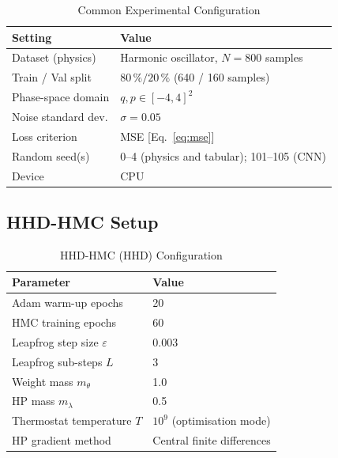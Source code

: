 \documentclass[11pt]{article}
\theoremstyle{definition}
\begin{document}
\begin{table}[H]
\centering
\caption{Common Experimental Configuration}
\label{tab:common_setup}
\renewcommand{\arraystretch}{1.2}
\begin{tabular}{ll}
\toprule
Setting & Value \\
\midrule
Dataset (physics)    & Harmonic oscillator, $N = 800$ samples \\
Train / Val split    & $80\,\% / 20\,\%$ (640 / 160 samples) \\
Phase-space domain   & $q, p \in [-4, 4]^2$ \\
Noise standard dev.  & $\sigma = 0.05$ \\
Loss criterion       & MSE [Eq.~\eqref{eq:mse}] \\
Random seed(s)       & 0--4 (physics and tabular); 101--105 (CNN) \\
Device               & CPU \\
\bottomrule
\end{tabular}
\end{table}

\subsection{HHD-HMC Setup}
\begin{table}[H]
\centering
\caption{HHD-HMC (HHD) Configuration}
\label{tab:setup_a}
\renewcommand{\arraystretch}{1.2}
\begin{tabular}{ll}
\toprule
Parameter & Value \\
\midrule
Adam warm-up epochs             & 20 \\
HMC training epochs             & 60 \\
Leapfrog step size $\varepsilon$ & 0.003 \\
Leapfrog sub-steps $L$          & 3 \\
Weight mass $m_\theta$          & 1.0 \\
HP mass $m_\lambda$             & 0.5 \\
Thermostat temperature $T$      & $10^9$ (optimisation mode) \\
HP gradient method              & Central finite differences \\
\bottomrule
\end{tabular}
\end{table}
\end{document}
